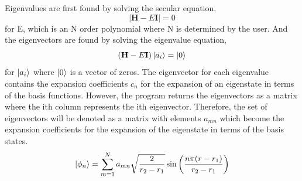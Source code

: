 \documentclass[12pt]{article}
\newcommand{\be}{\begin{equation}}
\newcommand{\ee}{\end{equation}}
\begin{document}
Eigenvalues are first found by solving the secular equation,
\be
    |\textbf{H} - E \textbf{I}| = 0
\ee
for E, which is an N order polynomial where N is determined by the user. And the eigenvectors are found by solving the eigenvalue equation,
\be
    (\textbf{H} - E \textbf{I}) \ket{a_i} = \ket{0}
\ee
for $\ket{a_i}$ where $\ket{0}$ is a vector of zeros. The eigenvector for each eigenvalue contains the expansion coefficients $c_n$ for the expansion of an eigenstate in terms of the basis functions. However, the program returns the eigenvectors as a matrix where the ith column represents the ith eigenvector. Therefore, the set of eigenvectors will be denoted as a matrix with elements $a_{mn}$ which become the expansion coefficients for the expansion of the eigenstate in terms of the basis states.
\be
    \ket{\phi_n} = \sum_{m = 1}^{N} a_{mn} \sqrt{ \frac{2}{r_2-r_1}} \sin \left(\frac{n \pi (r - r_1)}{r_2 - r_1} \right)
\ee



\end{document}
